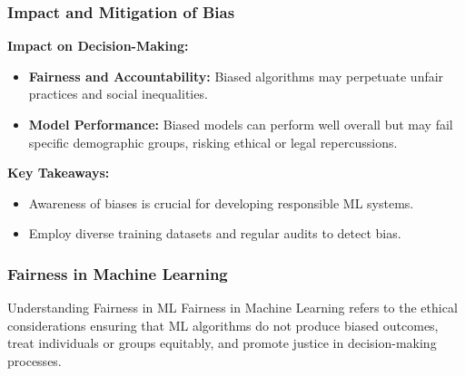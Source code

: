 \documentclass[aspectratio=169]{beamer}
\begin{document}
\begin{frame}[fragile]
    \frametitle{Impact and Mitigation of Bias}
    \textbf{Impact on Decision-Making:}
    \begin{itemize}
        \item \textbf{Fairness and Accountability:} Biased algorithms may perpetuate unfair practices and social inequalities.
        \item \textbf{Model Performance:} Biased models can perform well overall but may fail specific demographic groups, risking ethical or legal repercussions.
    \end{itemize}
    
    \textbf{Key Takeaways:}
    \begin{itemize}
        \item Awareness of biases is crucial for developing responsible ML systems.
        \item Employ diverse training datasets and regular audits to detect bias.
    \end{itemize}
\end{frame}

\begin{frame}[fragile]
    \frametitle{Fairness in Machine Learning}
    \begin{block}{Understanding Fairness in ML}
        Fairness in Machine Learning refers to the ethical considerations ensuring that ML algorithms do not produce biased outcomes, treat individuals or groups equitably, and promote justice in decision-making processes.
    \end{block}
\end{frame}
\end{document}
